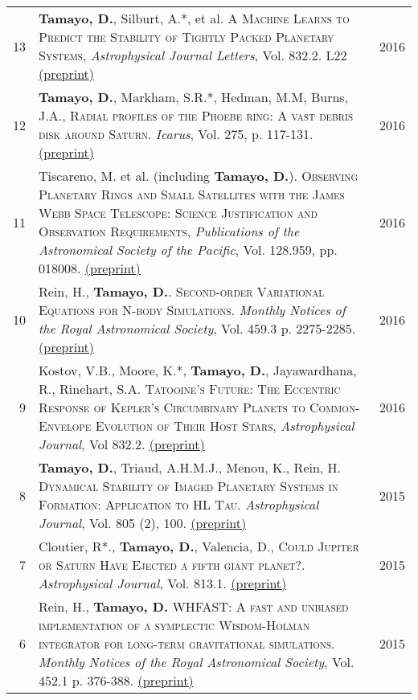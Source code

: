 \documentclass[10pt]{article} %
\begin{document}
\begin{tabular}{>{\hfill}r|p{14.3cm}l}
13 & {\bf Tamayo, D.}, Silburt, A.*, et al. \textsc{A Machine Learns to Predict the Stability of Tightly Packed Planetary Systems}, {\it Astrophysical Journal Letters}, Vol. 832.2. L22 \href{https://arxiv.org/abs/1610.05359}{(preprint)}& 2016 \\

12 & {\bf Tamayo, D.}, Markham, S.R.*, Hedman, M.M, Burns, J.A., \textsc{Radial profiles of the Phoebe ring: A vast debris disk around Saturn}.  {\it Icarus}, Vol. 275, p. 117-131. \href{http://arxiv.org/abs/1604.03119}{(preprint)} & 2016 \\

11 & Tiscareno, M. et al. (including {\bf Tamayo, D.}). \textsc{Observing Planetary Rings and Small Satellites with the James Webb Space Telescope: Science Justification and Observation Requirements}, {\it Publications of the Astronomical Society of the Pacific}, Vol. 128.959, pp. 018008. \href{https://arxiv.org/abs/1403.6849v3}{(preprint)} & 2016 \\

10 & Rein, H., {\bf Tamayo, D.}. \textsc{Second-order Variational Equations for N-body Simulations.} {\it Monthly Notices of the Royal Astronomical Society}, Vol. 459.3 p. 2275-2285. \href{http://arxiv.org/abs/1603.03424}{(preprint)} & 2016 \\

9 & Kostov, V.B., Moore, K.*, {\bf Tamayo, D.}, Jayawardhana, R., Rinehart, S.A. \textsc{Tatooine's Future: The Eccentric Response of Kepler's Circumbinary Planets to Common-Envelope Evolution of Their Host Stars}, {\it Astrophysical Journal}, Vol 832.2. \href{https://arxiv.org/abs/1610.03436}{(preprint)} & 2016 \\

8 & {\bf Tamayo, D.}, Triaud, A.H.M.J., Menou, K., Rein, H. \textsc{Dynamical Stability of Imaged Planetary Systems in Formation:  Application to HL Tau}. {\it Astrophysical Journal}, Vol. 805 (2), 100. \href{http://arxiv.org/abs/1502.05099}{(preprint)} & 2015 \\

7 & Cloutier, R*., {\bf Tamayo, D.}, Valencia, D., \textsc{Could Jupiter or Saturn Have Ejected a fifth giant planet?}.  {\it Astrophysical Journal}, Vol. 813.1. \href{http://arxiv.org/abs/1509.05397}{(preprint)} & 2015 \\

6 & Rein, H., {\bf Tamayo, D.} \textsc{WHFAST: A fast and unbiased implementation of a symplectic Wisdom-Holman integrator for long-term gravitational simulations}. {\it Monthly Notices of the Royal Astronomical Society}, Vol. 452.1 p. 376-388. \href{http://arxiv.org/abs/1506.01084}{(preprint)} & 2015 \\


\end{tabular}
\end{document}

